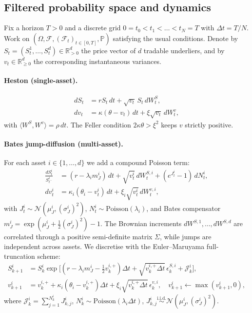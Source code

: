 \documentclass[11pt,a4paper]{article}
\newcommand{\R}{\mathbb{R}}
\newcommand{\PP}{\mathbb{P}}
\newcommand{\F}{\mathcal{F}}
\begin{document}
\subsection{Filtered probability space and dynamics}

Fix a horizon $T>0$ and a discrete grid $0 = t_0 < t_1 < \dots < t_N = T$
with $\Delta t = T/N$.  Work on $(\Omega, \F, (\F_t)_{t \in [0,T]}, \PP)$
satisfying the usual conditions.  Denote by
$S_t = (S_t^1,\dots,S_t^d) \in \R^d_{>0}$ the price vector of $d$ tradable
underliers, and by $v_t \in \R^d_{\ge 0}$ the corresponding instantaneous
variances.

\paragraph{Heston (single-asset).}
\begin{align}
dS_t &= rS_t\,dt + \sqrt{v_t}\,S_t\,dW_t^S, \\
dv_t &= \kappa(\theta - v_t)\,dt + \xi\sqrt{v_t}\,dW_t^v,
\end{align}
with $\langle W^S, W^v\rangle = \rho\,dt$.  The Feller condition
$2\kappa\theta>\xi^2$ keeps $v$ strictly positive.

\paragraph{Bates jump-diffusion (multi-asset).}
For each asset $i\in\{1,\dots,d\}$ we add a compound Poisson term:
\begin{align}
\frac{dS_t^i}{S_{t^-}^i} &= (r-\lambda_i m^i_J)\,dt + \sqrt{v_t^i}\,dW_t^{S,i}
+(e^{J_t^i}-1)\,dN_t^i, \\
dv_t^i &= \kappa_i(\theta_i - v_t^i)\,dt + \xi_i\sqrt{v_t^i}\,dW_t^{v,i},
\end{align}
with $J_t^i\sim\mathcal{N}(\mu_J^i,(\sigma_J^i)^2)$, $N_t^i\sim
\text{Poisson}(\lambda_i)$, and Bates compensator
$m_J^i = \exp(\mu_J^i + \tfrac12(\sigma_J^i)^2) - 1$.  The Brownian
increments $dW^{S,1},\dots,dW^{S,d}$ are correlated through a positive
semi-definite matrix $\Sigma$, while jumps are independent across assets.
We discretise with the Euler--Maruyama full-truncation scheme:
\begin{align}
S_{k+1}^i &= S_k^i \exp\!\big[(r-\lambda_i m_J^i - \tfrac12 v_k^{i,+})\Delta t
+ \sqrt{v_k^{i,+}\Delta t}\,\epsilon_k^{S,i} + \mathcal{J}_k^i\big],\\
v_{k+1}^i &= v_k^{i,+} + \kappa_i(\theta_i - v_k^{i,+})\Delta t
+ \xi_i\sqrt{v_k^{i,+}\Delta t}\,\epsilon_k^{v,i}, \quad v_{k+1}^i\gets\max(v_{k+1}^i,0),
\end{align}
where $\mathcal{J}_k^i = \sum_{j=1}^{N_k^i} J_{k,j}^i$, $N_k^i \sim
\text{Poisson}(\lambda_i \Delta t)$, $J_{k,j}^i\stackrel{\text{i.i.d.}}{\sim}
\mathcal{N}(\mu_J^i,(\sigma_J^i)^2)$.
\end{document}
